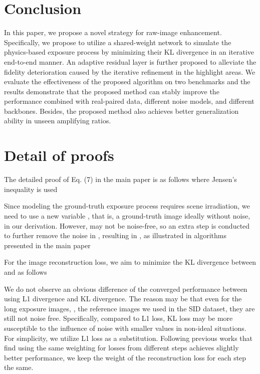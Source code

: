 \documentclass[10pt,twocolumn,letterpaper]{article}
\begin{document}
\section{Conclusion}
\vspace{-0.1cm}
In this paper, we propose a novel strategy for raw-image enhancement. Specifically, we propose to utilize a shared-weight network to simulate the physics-based exposure process by minimizing their KL divergence in an iterative end-to-end manner. An adaptive residual layer is further proposed to alleviate the fidelity deterioration caused by the iterative refinement in the highlight areas. We evaluate the effectiveness of the proposed algorithm on two benchmarks and the results demonstrate that the proposed method can stably improve the performance combined with real-paired data, different noise models, and different backbones. Besides, the proposed method also achieves better generalization ability in unseen amplifying ratios.
 



{\small


}


\appendix

\section{Detail of proofs}
The detailed proof of Eq. (7) in the main paper is as follows where Jensen's inequality is used

Since modeling the ground-truth exposure process requires scene irradiation, we need to use a new variable  , that is, a ground-truth image ideally without noise, in our derivation. However,  may not be noise-free, so an extra step is conducted to further remove the noise in , resulting in , as illustrated in algorithms presented in the main paper

For the image reconstruction loss, we aim to minimize the KL divergence between  and  as follows

We do not observe an obvious difference of the converged performance between using L1 divergence and KL divergence. The reason may be that even for the long exposure images, \eg, the reference images we used in the SID dataset, they are still not noise free. Specifically, compared to L1 loss, KL loss may be more susceptible to the influence of noise with smaller values in non-ideal situations. For simplicity, we utilize L1 loss as a substitution.
Following previous works that find using the same weighting for losses from different steps achieves slightly better performance, we keep the weight of the reconstruction loss for each step the same.
\end{document}

